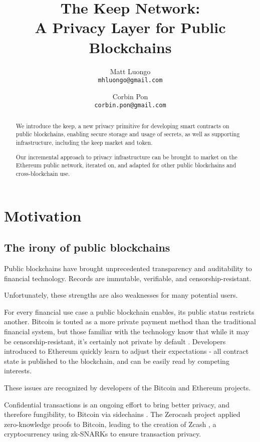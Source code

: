 \documentclass[11pt]{article}
\title{The Keep Network:\protect\\A Privacy Layer for Public Blockchains}
\author{Matt Luongo \\
  {\tt mhluongo@gmail.com}}
\author{Corbin Pon \\
  {\tt corbin.pon@gmail.com}}
\date{}
\begin{document}
 \maketitle \begin{abstract}

  We introduce the keep, a new privacy primitive for developing smart
  contracts on public blockchains, enabling secure storage and usage
  of secrets, as well as supporting infrastructure, including the keep
  market and token.

  Our incremental approach to privacy infrastructure can be brought
  to market on the Ethereum public network, iterated on, and adapted
  for other public blockchains and cross-blockchain use.

\end{abstract}

\section{Motivation}

\subsection{The irony of public blockchains}

Public blockchains have brought unprecedented transparency and
auditability to financial technology. Records are immutable,
verifiable, and censorship-resistant.

Unfortunately, these strengths are also weaknesses for many potential
users.

For every financial use case a public blockchain enables, its public
status restricts another. Bitcoin is touted as a more private payment
method than the traditional financial system, but those familiar with
the technology know that while it may be censorship-resistant, it's
certainly not private by default \cite{bitcoinPrivacy}. Developers
introduced to Ethereum quickly learn to adjust their expectations
\cite{ethereumStackexchange}- all contract state is published to the
blockchain, and can be easily read by competing interests.

These issues are recognized by developers of the Bitcoin and Ethereum
projects.

Confidential transactions \cite{confidentialTransactions} is an
ongoing effort to bring better privacy, and therefore fungibility, to
Bitcoin via sidechains \cite{confidentialTransactionsElements}. The
Zerocash project \cite{zerocash} applied zero-knowledge proofs to
Bitcoin, leading to the creation of Zcash \cite{zcash}, a
cryptocurrency using zk-SNARKs to ensure transaction privacy.
\end{document}
